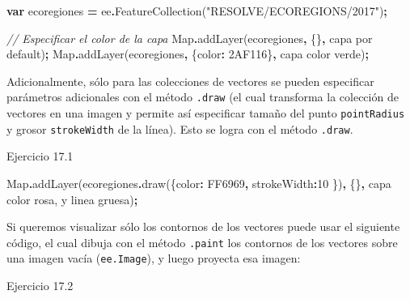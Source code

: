 \documentclass[
  12pt,
  letterpaper,
  twoside]{book}
\newenvironment{Shaded}{\begin{snugshade}}{\end{snugshade}}
\newcommand{\BuiltInTok}[1]{#1}
\newcommand{\CommentTok}[1]{\textcolor[rgb]{0.56,0.35,0.01}{\textit{#1}}}
\newcommand{\DataTypeTok}[1]{\textcolor[rgb]{0.13,0.29,0.53}{#1}}
\newcommand{\DecValTok}[1]{\textcolor[rgb]{0.00,0.00,0.81}{#1}}
\newcommand{\FunctionTok}[1]{\textcolor[rgb]{0.00,0.00,0.00}{#1}}
\newcommand{\KeywordTok}[1]{\textcolor[rgb]{0.13,0.29,0.53}{\textbf{#1}}}
\newcommand{\NormalTok}[1]{#1}
\newcommand{\OperatorTok}[1]{\textcolor[rgb]{0.81,0.36,0.00}{\textbf{#1}}}
\newcommand{\StringTok}[1]{\textcolor[rgb]{0.31,0.60,0.02}{#1}}
\begin{document}
\begin{Shaded}
\begin{Highlighting}[]
\KeywordTok{var}\NormalTok{ ecoregiones }\OperatorTok{=}\NormalTok{ ee}\OperatorTok{.}\FunctionTok{FeatureCollection}\NormalTok{(}\StringTok{"RESOLVE/ECOREGIONS/2017"}\NormalTok{)}\OperatorTok{;}

\CommentTok{// Especificar el color de la capa }
\BuiltInTok{Map}\OperatorTok{.}\FunctionTok{addLayer}\NormalTok{(ecoregiones}\OperatorTok{,}\NormalTok{ \{\}}\OperatorTok{,} \StringTok{\textquotesingle{}capa por default\textquotesingle{}}\NormalTok{)}\OperatorTok{;}
\BuiltInTok{Map}\OperatorTok{.}\FunctionTok{addLayer}\NormalTok{(ecoregiones}\OperatorTok{,}\NormalTok{ \{}\DataTypeTok{color}\OperatorTok{:} \StringTok{\textquotesingle{}2AF116\textquotesingle{}}\NormalTok{\}}\OperatorTok{,} \StringTok{\textquotesingle{}capa color verde\textquotesingle{}}\NormalTok{)}\OperatorTok{;}
\end{Highlighting}
\end{Shaded}

Adicionalmente, sólo para las colecciones de vectores se pueden especificar parámetros adicionales con el método \texttt{.draw} (el cual transforma la colección de vectores en una imagen y permite así especificar tamaño del punto \texttt{pointRadius} y grosor \texttt{strokeWidth} de la línea). Esto se logra con el método \texttt{.draw}.

Ejercicio 17.1

\begin{Shaded}
\begin{Highlighting}[]
\BuiltInTok{Map}\OperatorTok{.}\FunctionTok{addLayer}\NormalTok{(ecoregiones}\OperatorTok{.}\FunctionTok{draw}\NormalTok{(\{}\DataTypeTok{color}\OperatorTok{:} \StringTok{\textquotesingle{}FF6969\textquotesingle{}}\OperatorTok{,} \DataTypeTok{strokeWidth}\OperatorTok{:}\DecValTok{10}\NormalTok{ \})}\OperatorTok{,}\NormalTok{ \{\}}\OperatorTok{,}
  \StringTok{\textquotesingle{}capa color rosa, y linea gruesa\textquotesingle{}}\NormalTok{)}\OperatorTok{;}
\end{Highlighting}
\end{Shaded}

Si queremos visualizar sólo los contornos de los vectores puede usar el siguiente código, el cual dibuja con el método \texttt{.paint} los contornos de los vectores sobre una imagen vacía (\texttt{ee.Image}), y luego proyecta esa imagen:

Ejercicio 17.2
\end{document}
